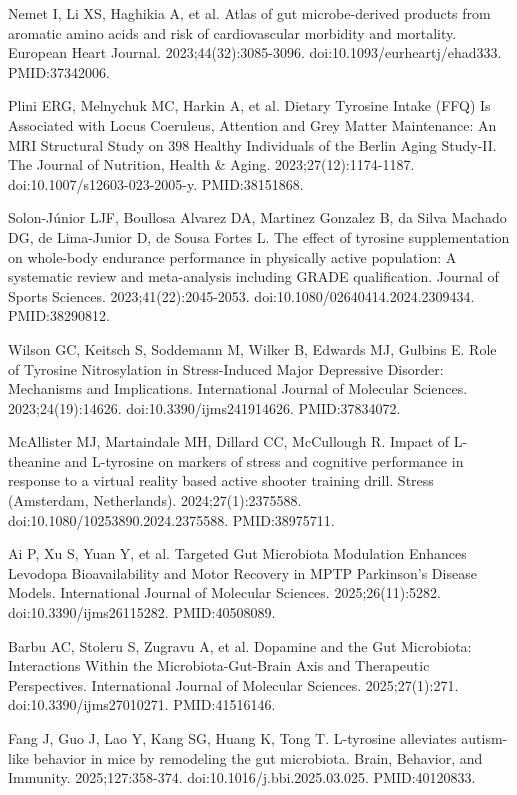 \documentclass[12pt,oneside]{book}
\newcommand{\reff}[2]{\par\hangindent=7mm\hangafter=1\noindent[#1]\hspace{2mm}#2\par}
\begin{document}
\reff{19}{Nemet I, Li XS, Haghikia A, et al. Atlas of gut microbe-derived products from aromatic amino acids and risk of cardiovascular morbidity and mortality. European Heart Journal. 2023;44(32):3085-3096. doi:10.1093/eurheartj/ehad333. PMID:37342006.}

\reff{20}{Plini ERG, Melnychuk MC, Harkin A, et al. Dietary Tyrosine Intake (FFQ) Is Associated with Locus Coeruleus, Attention and Grey Matter Maintenance: An MRI Structural Study on 398 Healthy Individuals of the Berlin Aging Study-II. The Journal of Nutrition, Health \& Aging. 2023;27(12):1174-1187. doi:10.1007/s12603-023-2005-y. PMID:38151868.}

\reff{21}{Solon-Júnior LJF, Boullosa Alvarez DA, Martinez Gonzalez B, da Silva Machado DG, de Lima-Junior D, de Sousa Fortes L. The effect of tyrosine supplementation on whole-body endurance performance in physically active population: A systematic review and meta-analysis including GRADE qualification. Journal of Sports Sciences. 2023;41(22):2045-2053. doi:10.1080/02640414.2024.2309434. PMID:38290812.}

\reff{22}{Wilson GC, Keitsch S, Soddemann M, Wilker B, Edwards MJ, Gulbins E. Role of Tyrosine Nitrosylation in Stress-Induced Major Depressive Disorder: Mechanisms and Implications. International Journal of Molecular Sciences. 2023;24(19):14626. doi:10.3390/ijms241914626. PMID:37834072.}

\reff{23}{McAllister MJ, Martaindale MH, Dillard CC, McCullough R. Impact of L-theanine and L-tyrosine on markers of stress and cognitive performance in response to a virtual reality based active shooter training drill. Stress (Amsterdam, Netherlands). 2024;27(1):2375588. doi:10.1080/10253890.2024.2375588. PMID:38975711.}

\reff{24}{Ai P, Xu S, Yuan Y, et al. Targeted Gut Microbiota Modulation Enhances Levodopa Bioavailability and Motor Recovery in MPTP Parkinson's Disease Models. International Journal of Molecular Sciences. 2025;26(11):5282. doi:10.3390/ijms26115282. PMID:40508089.}

\reff{25}{Barbu AC, Stoleru S, Zugravu A, et al. Dopamine and the Gut Microbiota: Interactions Within the Microbiota-Gut-Brain Axis and Therapeutic Perspectives. International Journal of Molecular Sciences. 2025;27(1):271. doi:10.3390/ijms27010271. PMID:41516146.}

\reff{26}{Fang J, Guo J, Lao Y, Kang SG, Huang K, Tong T. L-tyrosine alleviates autism-like behavior in mice by remodeling the gut microbiota. Brain, Behavior, and Immunity. 2025;127:358-374. doi:10.1016/j.bbi.2025.03.025. PMID:40120833.}
\end{document}
